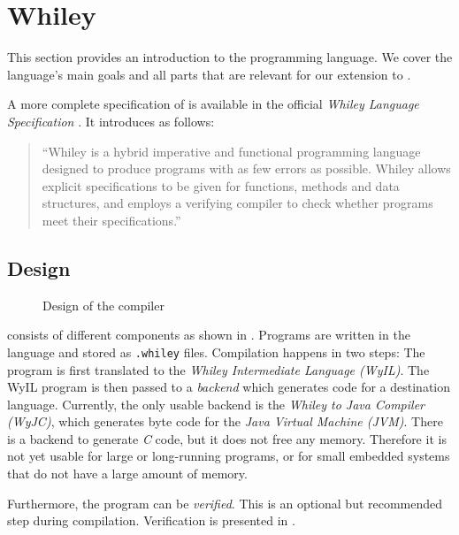 \section{Whiley}\label{section:background-whiley}

This section provides an introduction to the \whiley programming language.
We cover the language's main goals and all parts that are relevant for our extension to \whiley.

A more complete specification of \whiley is available in the official \emph{Whiley Language Specification} \cite{WLS}.
It introduces \whiley as follows:

\begin{quote}
``Whiley is a hybrid imperative and functional programming language designed to produce programs with as few errors as possible.
Whiley allows explicit specifications to be given for functions, methods and data structures, and employs a verifying compiler to check whether programs meet their specifications.'' \cite[p.~7]{WLS}
\end{quote}


\subsection{Design}

\begin{figure}[h]
\centering

\caption{Design of the \whiley compiler}
\label{figure:whiley-compiler-design}
\end{figure}

\whiley consists of different components as shown in .
Programs are written in the \whiley language and stored as \texttt{.whiley} files.
Compilation happens in two steps:
The program is first translated to the \emph{Whiley Intermediate Language (WyIL)}.
The WyIL program is then passed to a \emph{backend} which generates code for a destination language.
Currently, the only usable backend is the \emph{Whiley to Java Compiler (WyJC)}, which generates byte code for the \emph{Java Virtual Machine (JVM)}.
There is a backend to generate \emph{C} code, but it does not free any memory.
Therefore it is not yet usable for large or long-running programs, or for small embedded systems that do not have a large amount of memory.

Furthermore, the program can be \emph{verified}.
This is an optional but recommended step during compilation.
Verification is presented in .


